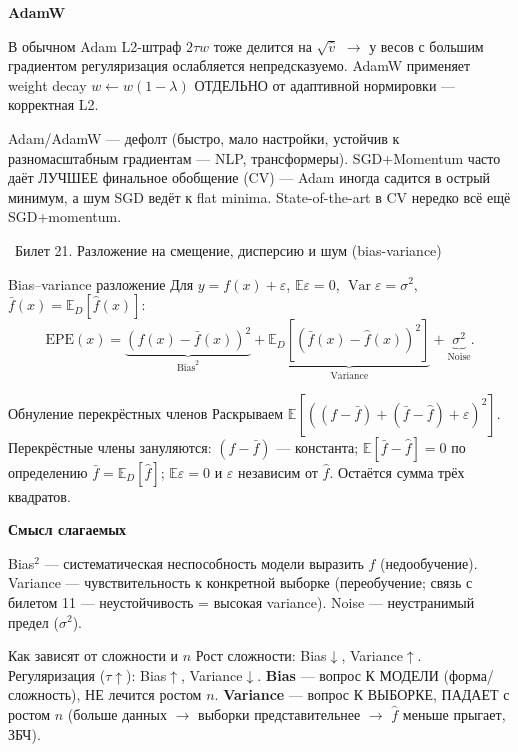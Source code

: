 \documentclass[12pt, a4paper]{article}
\newcommand{\bilet}[2]{%
  \vspace{10pt}%
  \noindent\colorbox{qcolor}{\parbox{\dimexpr\linewidth-2\fboxsep\relax}{%
    \color{white}\large\bfseries\strut\ Билет #1. #2%
  }}%
  \nopagebreak\vspace{5pt}\par\nopagebreak%
}
\newcommand{\qsub}[1]{%
  \vspace{5pt}%
  {\bfseries\color{defblue} #1}%
  \par\vspace{2pt}%
}
\newcommand{\E}{\mathbb{E}}
\newcommand{\Var}{\operatorname{Var}}
\newcommand{\wh}[1]{\widehat{#1}}
\begin{document}
\qsub{AdamW}
В обычном Adam L2-штраф $2\tau w$ тоже делится на $\sqrt{\wh v}$ $\to$ у весов с большим градиентом регуляризация ослабляется непредсказуемо. AdamW применяет weight decay $w \leftarrow w(1-\lambda)$ ОТДЕЛЬНО от адаптивной нормировки --- корректная L2.

\begin{fishkabox}
Adam/AdamW --- дефолт (быстро, мало настройки, устойчив к разномасштабным градиентам --- NLP, трансформеры). SGD+Momentum часто даёт ЛУЧШЕЕ финальное обобщение (CV) --- Adam иногда садится в острый минимум, а шум SGD ведёт к flat minima. State-of-the-art в CV нередко всё ещё SGD+momentum.
\end{fishkabox}

\bilet{21}{Разложение на смещение, дисперсию и шум (bias-variance)}

\begin{thmbox}{Bias--variance разложение}
Для $y = f(x) + \varepsilon$, $\E\varepsilon = 0$, $\Var\varepsilon = \sigma^2$, $\bar f(x) = \E_D[\wh f(x)]$:
\[
  \text{EPE}(x) = \underbrace{(f(x) - \bar f(x))^2}_{\text{Bias}^2} + \underbrace{\E_D[(\bar f(x) - \wh f(x))^2]}_{\text{Variance}} + \underbrace{\sigma^2}_{\text{Noise}}.
\]
\end{thmbox}

\begin{proofbox}{Обнуление перекрёстных членов}
Раскрываем $\E[((f - \bar f) + (\bar f - \wh f) + \varepsilon)^2]$. Перекрёстные члены зануляются: $(f - \bar f)$ --- константа; $\E[\bar f - \wh f] = 0$ по определению $\bar f = \E_D[\wh f]$; $\E\varepsilon = 0$ и $\varepsilon$ независим от $\wh f$. Остаётся сумма трёх квадратов.
\end{proofbox}

\qsub{Смысл слагаемых}
Bias$^2$ --- систематическая неспособность модели выразить $f$ (недообучение). Variance --- чувствительность к конкретной выборке (переобучение; связь с билетом 11 --- неустойчивость = высокая variance). Noise --- неустранимый предел ($\sigma^2$).

\begin{propbox}{Как зависят от сложности и $n$}
Рост сложности: Bias$\downarrow$, Variance$\uparrow$. Регуляризация ($\tau\uparrow$): Bias$\uparrow$, Variance$\downarrow$. \textbf{Bias} --- вопрос К МОДЕЛИ (форма/сложность), НЕ лечится ростом $n$. \textbf{Variance} --- вопрос К ВЫБОРКЕ, ПАДАЕТ с ростом $n$ (больше данных $\to$ выборки представительнее $\to$ $\wh f$ меньше прыгает, ЗБЧ).
\end{propbox}
\end{document}
